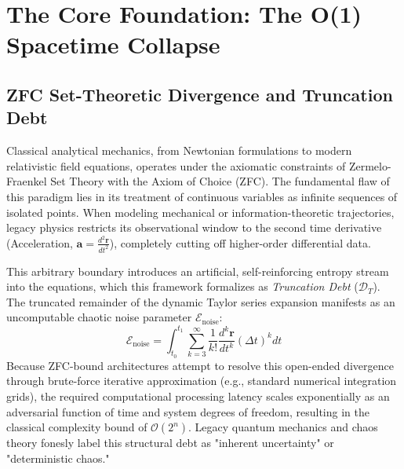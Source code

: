 \documentclass[11pt,a4paper]{article}
\begin{document}
\section{The Core Foundation: The O(1) Spacetime Collapse}

\subsection{ZFC Set-Theoretic Divergence and Truncation Debt}
Classical analytical mechanics, from Newtonian formulations to modern relativistic field equations, operates under the axiomatic constraints of Zermelo-Fraenkel Set Theory with the Axiom of Choice (ZFC). The fundamental flaw of this paradigm lies in its treatment of continuous variables as infinite sequences of isolated points. When modeling mechanical or information-theoretic trajectories, legacy physics restricts its observational window to the second time derivative (Acceleration, $\mathbf{a} = \frac{d^2\mathbf{r}}{dt^2}$), completely cutting off higher-order differential data. 

This arbitrary boundary introduces an artificial, self-reinforcing entropy stream into the equations, which this framework formalizes as \textit{Truncation Debt} ($\mathcal{D}_T$). The truncated remainder of the dynamic Taylor series expansion manifests as an uncomputable chaotic noise parameter $\mathcal{E}_{\text{noise}}$:
\begin{equation}
    \mathcal{E}_{\text{noise}} = \int_{t_0}^{t_1} \sum_{k=3}^{\infty} \frac{1}{k!} \frac{d^k\mathbf{r}}{dt^k} (\Delta t)^k dt
\end{equation}
Because ZFC-bound architectures attempt to resolve this open-ended divergence through brute-force iterative approximation (e.g., standard numerical integration grids), the required computational processing latency scales exponentially as an adversarial function of time and system degrees of freedom, resulting in the classical complexity bound of $\mathcal{O}(2^n)$. Legacy quantum mechanics and chaos theory fonesly label this structural debt as "inherent uncertainty" or "deterministic chaos."
\end{document}
